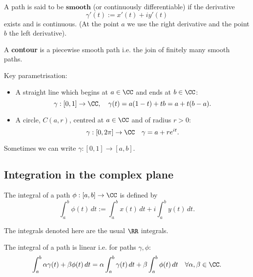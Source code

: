 \documentclass[12pt, a4paper]{article}
\begin{document}
\begin{definition}
    A path is said to be \(\textbf{smooth}\) (or continuously differentiable) if the derivative 
    \[\gamma'(t) := x'(t)+iy'(t)\]
    exists and is continuous. (At the point \(a\) we use the right derivative and the point \(b\) the left derivative).
\end{definition}

\begin{definition}
    A \textbf{contour} is a piecewise smooth path i.e. the join of finitely many smooth paths. 
\end{definition}

\begin{mdprop}
    Key parametrisation:
    \begin{itemize}
        \item A straight line which begins at \(a\in \CC\) and ends at \(b \in \CC\):
        \[\gamma:[0,1] \to \CC, \quad \gamma(t)=a(1-t)+tb = a+t(b-a).\]
        \item A circle, \(C(a,r)\), centred at \(a \in \CC\) and of radius \(r>0\):
        \[\gamma:[0,2\pi] \to \CC \quad \gamma=a+re^{it}.\]
    \end{itemize}
\end{mdprop}

\begin{mdremark}
    Sometimes we can write \(\gamma: [0,1] \to [a,b]\).
\end{mdremark}

\subsection{Integration in the complex plane}

\begin{definition}
    The integral of a path \(\phi :[a,b] \to \CC\) is defined by
    \[\int_{a}^{b} \phi(t) \, dt := \int_{a}^{b} x(t) \, dt + i \int_{a}^{b} y(t) \, dt.\]
\end{definition}

\begin{mdremark}
    The integrals denoted here are the usual \(\RR\) integrals.
\end{mdremark}

\begin{lemma}
    The integral of a path is linear i.e. for paths \(\gamma,\phi\):
    \[\int_{a}^{b} \alpha \gamma(t) +\beta \phi(t) \, dt = \alpha \int_{a}^{b} \gamma(t) \, dt +\beta \int_{a}^{b} \phi(t) \, dt \quad \forall \alpha,\beta \in \CC.\]
\end{lemma}
\end{document}
